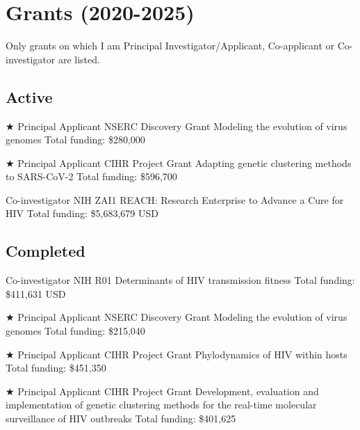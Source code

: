 
\section{Grants (2020-2025)}

Only grants on which I am Principal Investigator/Applicant, Co-applicant or Co-investigator are listed.


\subsection {Active}

{$\bigstar$ Principal Applicant}
{NSERC Discovery Grant}
{Modeling the evolution of virus genomes}
{Total funding: \$280,000}
{}

{$\bigstar$ Principal Applicant}
{CIHR Project Grant}
{Adapting genetic clustering methods to SARS-CoV-2}
{Total funding: \$596,700} %
{}


{Co-investigator}
{NIH ZAI1}  %
{REACH: Research Enterprise to Advance a Cure for HIV}
{Total funding: \$5,683,679 USD}
{}







\subsection {Completed}

{Co-investigator}
{NIH R01}  %
{Determinants of HIV transmission fitness}
{Total funding: \$411,631 USD}
{}


{$\bigstar$ Principal Applicant}
{NSERC Discovery Grant}
{Modeling the evolution of virus genomes}
{Total funding: \$215,040} %
{}


{$\bigstar$ Principal Applicant}
{CIHR Project Grant} %
{Phylodynamics of HIV within hosts}
{Total funding: \$451,350}
{}


{$\bigstar$ Principal Applicant}
{CIHR Project Grant} %
{Development, evaluation and implementation of genetic clustering methods for the real-time molecular surveillance of HIV outbreaks}
{Total funding: \$401,625}
{}



